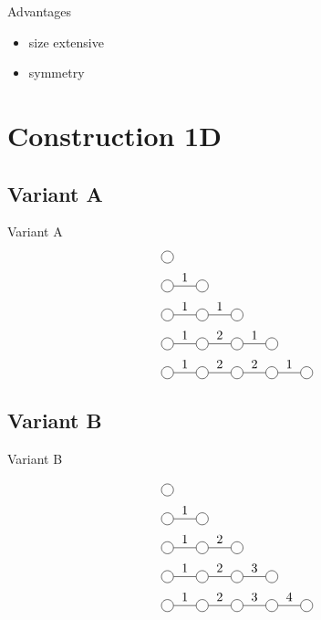 \documentclass[aspectratio=169]{beamer}
\begin{document}
\begin{frame}{Advantages}
    \begin{itemize}
        \item size extensive
        \item symmetry
    \end{itemize}
\end{frame}


\section{Construction 1D}

\subsection{Variant A}

\begin{frame}{Variant A}
    \begin{equation}
        \begin{split}
            &\mpob{1}{ {,}  }{}{}{}{{,,}} \\
            &\mpob{2}{ {,"1",}  }{}{}{}{{,,}}\\
            &\mpob{3}{ {,"1","1",}  }{}{}{}{{,,,}}\\
            &\mpob{4}{ {,"1","2","1",}  }{}{}{}{{,,,,,}}\\
            &\mpob{5}{ {,"1","2","2","1",}  }{}{}{}{{,,,,,}}\\
        \end{split}
    \end{equation}

\end{frame}

\subsection{Variant B}
\begin{frame}{Variant B}


    \begin{equation}
        \begin{split}
            &\mpob{1}{ {,}  }{}{}{}{{,,}} \\
            &\mpob{2}{ {,"1",}  }{}{}{}{{,,}}\\
            &\mpob{3}{ {,"1","2",}  }{}{}{}{{,,,}}\\
            &\mpob{4}{ {,"1","2","3",}  }{}{}{}{{,,,,,}}\\
            &\mpob{5}{ {,"1","2","3","4",}  }{}{}{}{{,,,,,}}\\
        \end{split}
    \end{equation}


\end{frame}
\end{document}
